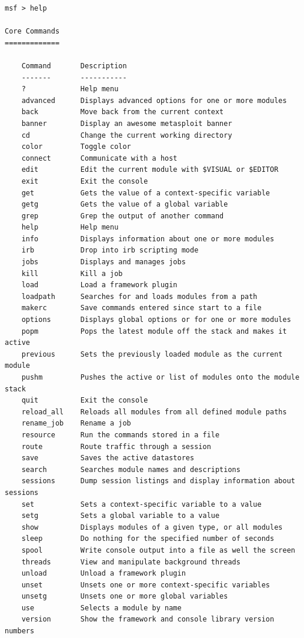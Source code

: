 \documentclass[10pt,a4paper]{report}
\begin{document}
		\begin{lstlisting}
msf > help

Core Commands
=============

    Command       Description
    -------       -----------
    ?             Help menu
    advanced      Displays advanced options for one or more modules
    back          Move back from the current context
    banner        Display an awesome metasploit banner
    cd            Change the current working directory
    color         Toggle color
    connect       Communicate with a host
    edit          Edit the current module with $VISUAL or $EDITOR
    exit          Exit the console
    get           Gets the value of a context-specific variable
    getg          Gets the value of a global variable
    grep          Grep the output of another command
    help          Help menu
    info          Displays information about one or more modules
    irb           Drop into irb scripting mode
    jobs          Displays and manages jobs
    kill          Kill a job
    load          Load a framework plugin
    loadpath      Searches for and loads modules from a path
    makerc        Save commands entered since start to a file
    options       Displays global options or for one or more modules
    popm          Pops the latest module off the stack and makes it active
    previous      Sets the previously loaded module as the current module
    pushm         Pushes the active or list of modules onto the module stack
    quit          Exit the console
    reload_all    Reloads all modules from all defined module paths
    rename_job    Rename a job
    resource      Run the commands stored in a file
    route         Route traffic through a session
    save          Saves the active datastores
    search        Searches module names and descriptions
    sessions      Dump session listings and display information about sessions
    set           Sets a context-specific variable to a value
    setg          Sets a global variable to a value
    show          Displays modules of a given type, or all modules
    sleep         Do nothing for the specified number of seconds
    spool         Write console output into a file as well the screen
    threads       View and manipulate background threads
    unload        Unload a framework plugin
    unset         Unsets one or more context-specific variables
    unsetg        Unsets one or more global variables
    use           Selects a module by name
    version       Show the framework and console library version numbers



\end{lstlisting}
\end{document}
